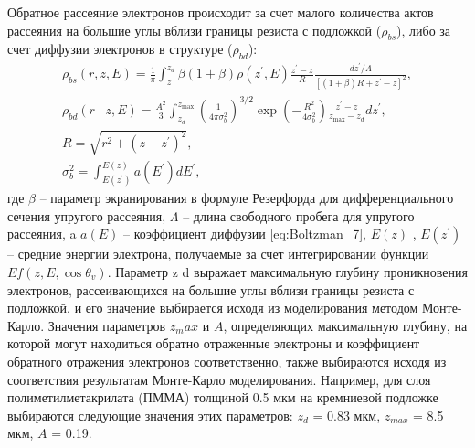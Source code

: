 Обратное рассеяние электронов происходит за счет малого количества актов рассеяния на большие углы вблизи границы резиста с подложкой ($\rho_{bs}$), либо за счет диффузии электронов в структуре ($\rho_{bd}$):
\begin{equation} \label{eq:Boltzman_12}
	\begin{gathered}
		\rho_{b s}(r, z, E)=\frac{1}{\pi} \int_z^{z_d} \beta(1+\beta) \rho\left(z^{\prime}, E\right) \frac{z^{\prime}-z}{R} \frac{d z^{\prime} / \Lambda}{\left[(1+\beta) R+z^{\prime}-z\right]^2}, \\
		\rho_{b d}(r \mid z, E)=\frac{A^2}{3} \int_{z_d}^{z_{\max }}\left(\frac{1}{4 \pi \sigma_b^2}\right)^{3 / 2} \exp \left(-\frac{R^2}{4 \sigma_b^2}\right) \frac{z^{\prime}-z}{z_{\max }-z_d} d z^{\prime},\\
		R=\sqrt{r^2+\left(z-z^{\prime}\right)^2}, \\ \sigma_b^2=\int_{E\left(z^{\prime}\right)}^{E(z)} a\left(E^{\prime}\right) d E^{\prime},
	\end{gathered}
\end{equation}
где $\beta$ -- параметр экранирования в формуле Резерфорда для дифференциального сечения упругого рассеяния, $\Lambda$ -- длина свободного пробега для упругого рассеяния, a $a(E)$ – коэффициент диффузии \ref{eq:Boltzman_7}, $E(z)$ , $E(z^\prime)$ – средние энергии электрона, получаемые за счет интегрировании функции $Ef(z, E, \cos \theta_v )$. Параметр z d выражает максимальную глубину проникновения электронов, рассеивающихся на большие углы вблизи границы резиста с подложкой, и его значение выбирается исходя из моделирования методом Монте-Карло. Значения параметров $z_max$ и $A$, определяющих максимальную глубину, на которой могут находиться обратно отраженные электроны и коэффициент обратного отражения электронов соответственно, также выбираются исходя из соответствия результатам Монте-Карло моделирования. Например, для слоя полиметилметакрилата (ПММА) толщиной 0.5 мкм на кремниевой подложке выбираются следующие значения этих параметров: $z_d$ = 0.83 мкм, $z_{max}$ = 8.5 мкм, $A$ = 0.19.

